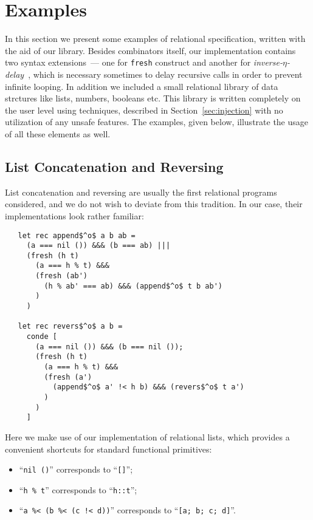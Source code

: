\section{Examples}
\label{sec:examples}

In this section we present some examples of relational specification, written with the aid of our library. 
Besides \miniKanren combinators itself, our implementation contains two syntax extensions~--- one
for \lstinline{fresh} construct and another for \emph{inverse-$\eta$-delay}~\cite{MicroKanren}, which is 
necessary sometimes to delay recursive calls in order to prevent infinite looping. In addition we included a 
small relational library of data strctures like lists, numbers, booleans etc. This library is written 
completely on the user level using techniques, described in Section~\ref{sec:injection} with no utilization 
of any unsafe features. The examples, given below, illustrate the usage of all these elements as well.

\subsection{List Concatenation and Reversing}

List concatenation and reversing are usually the first relational programs considered, and we do not wish
to deviate from this tradition. In our case, their implementations look rather familiar:

\begin{lstlisting}
   let rec append$^o$ a b ab =
     (a === nil ()) &&& (b === ab) |||
     (fresh (h t)
       (a === h % t) &&&
       (fresh (ab')
         (h % ab' === ab) &&& (append$^o$ t b ab') 
       )
     )

   let rec revers$^o$ a b =
     conde [
       (a === nil ()) &&& (b === nil ());
       (fresh (h t)
         (a === h % t) &&&
         (fresh (a')
           (append$^o$ a' !< h b) &&& (revers$^o$ t a')
         )
       )
     ]
\end{lstlisting}

Here we make use of our implementation of relational lists, which provides a convenient shortcuts for
standard functional primitives:

\begin{itemize}
  \item ``\lstinline{nil ()}'' corresponds to ``\lstinline{[]}'';
  \item ``\lstinline{h % t}'' corresponds to ``\lstinline{h::t}'';
  \item ``\lstinline{a %< (b %< (c !< d))}'' corresponds to ``\lstinline{[a; b; c; d]}''.
\end{itemize}


